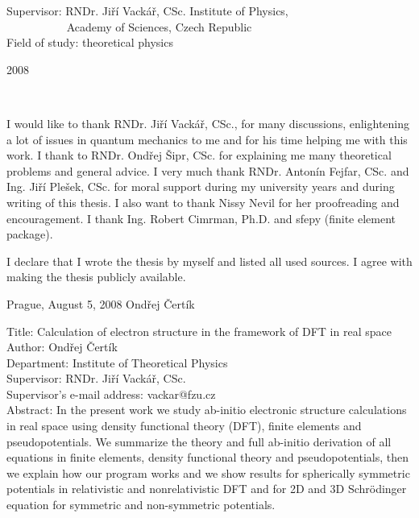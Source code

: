 \documentclass[12pt,notitlepage]{report}
\begin{document}
\begin{titlepage}
\large
\noindent Supervisor: RNDr. Jiří Vackář, CSc. Institute of Physics, \\
\hbox{$\quad\quad\quad\quad\quad$}   Academy of Sciences, Czech Republic
\vspace{1mm}\\
%
\noindent Field of study: theoretical physics
\bigskip
\bigskip
\begin{center}
2008
\end{center}

\end{titlepage}

\normalsize
\setcounter{page}{2}
\ \vspace{10mm}

\noindent I would like to thank RNDr. Jiří Vackář, CSc., for many discussions,
enlightening a lot of issues in quantum mechanics to me and for his time
helping me with this work. I thank to RNDr. Ondřej Šipr, CSc. for explaining me
many theoretical problems and general advice. I very much thank RNDr.  Antonín
Fejfar, CSc. and Ing. Jiří Plešek, CSc. for moral support during my university
years and during writing of this thesis. I also want to thank Nissy Nevil for
her proofreading and encouragement. I thank Ing. Robert Cimrman, Ph.D.
and sfepy (finite element package).

\vspace{\fill}
\noindent I declare that I wrote the thesis by myself and listed all used
sources. I agree with making the thesis publicly available.

\bigskip
\noindent Prague, August 5, 2008 \hspace{\fill}Ondřej Čertík\\ %



\newpage %

\noindent
Title: Calculation of electron structure in the framework of DFT in real
space\\
Author: Ondřej Čertík\\
Department: Institute of Theoretical Physics\\
Supervisor: RNDr. Jiří Vackář, CSc.\\
Supervisor's e-mail address: vackar@fzu.cz\\

\noindent Abstract: In the present work we study ab-initio electronic structure
calculations in real space using density functional theory (DFT), finite
elements and pseudopotentials. We summarize the theory and full ab-initio
derivation of all equations in finite elements, density functional theory and
pseudopotentials, then we explain how our program works and we show results for
spherically symmetric potentials in relativistic and nonrelativistic DFT and
for 2D and 3D Schr\"odinger equation for symmetric and non-symmetric
potentials. \\
\end{document}
